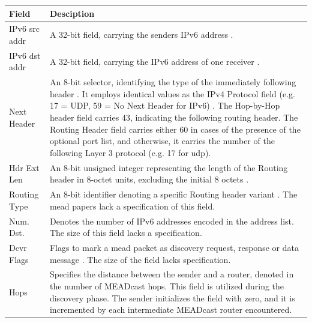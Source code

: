 \bgroup
\begin{table}[!htbp]
\centering
\def\arraystretch{1.35}%
\setlength{\tabcolsep}{1.2em}
\begin{tabularx}{\textwidth}{lX}
\toprule
\textbf{Field}& \textbf{Desciption} \\
\midrule
IPv6 src addr & A 32-bit field, carrying the senders IPv6 address
                \cite{meadcast2}.\\
IPv6 dst addr & A 32-bit field, carrying the IPv6 address of one receiver
                \cite{meadcast2}.\\ \midrule
Next Header   & An 8-bit selector, identifying the type of the immediately
                following header \cite{rfc8200_ipv6_hdr}.
                It employs identical values as the IPv4 Protocol field (e.g. 17
                = UDP, 59 = No Next Header for IPv6) \cite{iana_prot_nums}.
                The Hop-by-Hop header field carries 43, indicating the
                following routing header.
                The Routing Header field carries either 60 in cases of the
                presence of the optional port list, and otherwise, it carries 
                the number of the following Layer 3 protocol (e.g. 17 for
                \gls{udp}). \\
Hdr Ext Len   & An 8-bit unsigned integer representing the length of the
                Routing header in 8-octet units, excluding the initial 8
                octets \cite{rfc8200_ipv6_hdr}. \\
Routing Type  & An 8-bit identifier denoting a specific Routing header variant
                \cite{rfc8200_ipv6_hdr}.
                The \gls{mead} papers \cite{meadcast1,meadcast2} lack a
                specification of this field.\\
Num. Dst.     & Denotes the number of IPv6 addresses encoded in the address
                list.
                The size of this field lacks a specification.\\
Dcvr Flags    & Flags to mark a \gls{mead} packet as discovery request,
                response or data message \cite{meadcast2}.
                The size of the field lacks specification. \\
Hops          & Specifies the distance between the sender and a router, denoted
                in the number of MEADcast hops.
                This field is utilized during the discovery phase. The sender
                initializes the field with zero, and it is incremented by each
                intermediate MEADcast router encountered.

\end{tabularx}
\end{table}
